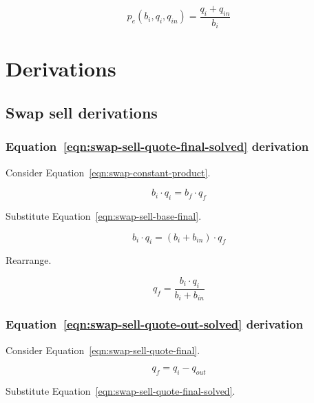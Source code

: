 \documentclass[table, twocolumn]{article}
\begin{document}
\begin{equation}\label{eqn:swap-buy-execution-price-solved}
	p_e (b_i, q_i, q_{in}) = \frac{q_i + q_{in}}{b_i}
\end{equation}

\section{Derivations}\label{sec:derivations}

\subsection{Swap sell derivations}\label{ssec:swap-sell-derivations}

\subsubsection{Equation~\ref{eqn:swap-sell-quote-final-solved} derivation}%
\label{sssec:equation-eqn-swap-sell-quote-final-solved-derivation}

Consider Equation~\ref{eqn:swap-constant-product}.

\begin{equation}
	b_i \cdot q_i = b_f \cdot q_f \nonumber
\end{equation}

Substitute Equation~\ref{eqn:swap-sell-base-final}.

\begin{equation}
	b_i \cdot q_i = (b_i + b_{in}) \cdot q_f \nonumber
\end{equation}

Rearrange.

\begin{equation}
	q_f = \frac{b_i \cdot q_i}{b_i + b_{in}} \nonumber
\end{equation}

\subsubsection{Equation~\ref{eqn:swap-sell-quote-out-solved} derivation}%
\label{sssec:equation-eqn-swap-sell-quote-out-solved-derivation}

Consider Equation~\ref{eqn:swap-sell-quote-final}.

\begin{equation}
	q_f = q_i - q_{out} \nonumber
\end{equation}

Substitute Equation~\ref{eqn:swap-sell-quote-final-solved}.
\end{document}
